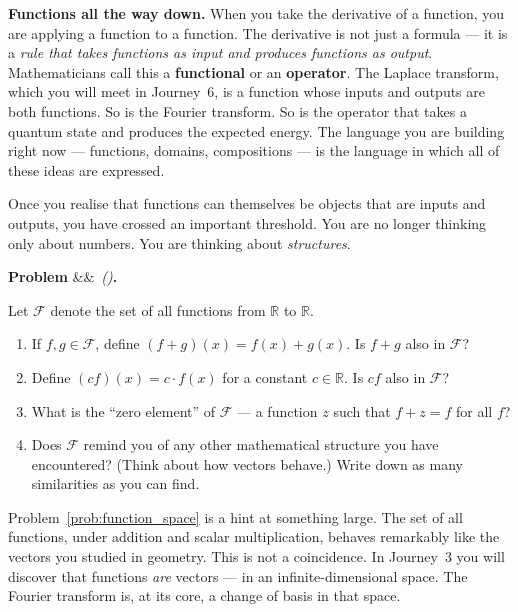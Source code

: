 \documentclass[12pt, a4paper]{article}
\newcounter{problem}
\newenvironment{problem}[1][]{%
  \refstepcounter{problem}%
  \par\vspace{6pt}%
  \noindent\textbf{\color{MidBlue}Problem \theproblem}%
  \ifx&#1&\else\ \textit{(#1)}\fi\textbf{.}\enskip
}{\par\vspace{4pt}}
\begin{document}
\begin{thought}
\textbf{Functions all the way down.}
When you take the derivative of a function, you are applying a function to a function. The derivative is not just a formula --- it is a \emph{rule that takes functions as input and produces functions as output}. Mathematicians call this a \textbf{functional} or an \textbf{operator}. The Laplace transform, which you will meet in Journey~6, is a function whose inputs and outputs are both functions. So is the Fourier transform. So is the operator that takes a quantum state and produces the expected energy. The language you are building right now --- functions, domains, compositions --- is the language in which all of these ideas are expressed.

Once you realise that functions can themselves be objects that are inputs and outputs, you have crossed an important threshold. You are no longer thinking only about numbers. You are thinking about \emph{structures}.
\end{thought}

\begin{problem}
\label{prob:function_space}
Let $\mathcal{F}$ denote the set of all functions from $\mathbb{R}$ to $\mathbb{R}$.
\begin{enumerate}[label=(\alph*), topsep=2pt]
  \item If $f, g \in \mathcal{F}$, define $(f + g)(x) = f(x) + g(x)$. Is $f + g$ also in $\mathcal{F}$?
  \item Define $(cf)(x) = c \cdot f(x)$ for a constant $c \in \mathbb{R}$. Is $cf$ also in $\mathcal{F}$?
  \item What is the ``zero element'' of $\mathcal{F}$ --- a function $z$ such that $f + z = f$ for all $f$?
  \item Does $\mathcal{F}$ remind you of any other mathematical structure you have encountered? (Think about how vectors behave.) Write down as many similarities as you can find.
\end{enumerate}
\end{problem}

\medskip
Problem~\ref{prob:function_space} is a hint at something large. The set of all functions, under addition and scalar multiplication, behaves remarkably like the vectors you studied in geometry. This is not a coincidence. In Journey~3 you will discover that functions \emph{are} vectors --- in an infinite-dimensional space. The Fourier transform is, at its core, a change of basis in that space.
\end{document}
